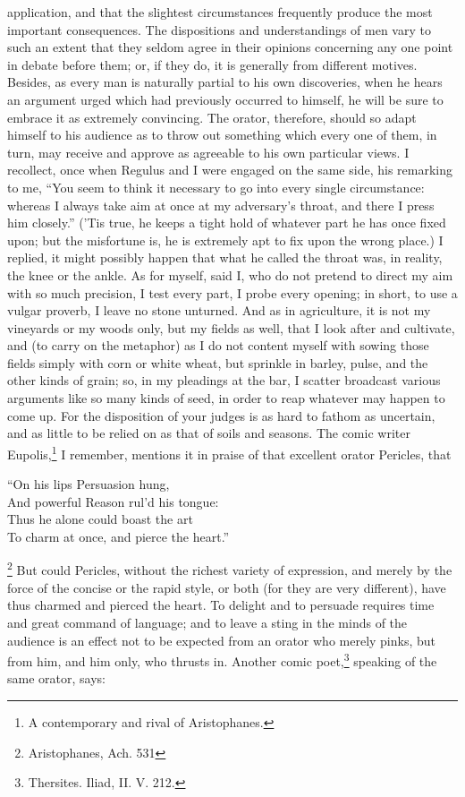 application, and that the slightest circumstances frequently produce the
most important consequences. The dispositions and understandings of men
vary to such an extent that they seldom agree in their opinions concerning
any one point in debate before them; or, if they do, it is generally from
different motives. Besides, as every man is naturally partial to his own
discoveries, when he hears an argument urged which had previously occurred
to himself, he will be sure to embrace it as extremely convincing. The
orator, therefore, should so adapt himself to his audience as to throw out
something which every one of them, in turn, may receive and approve as
agreeable to his own particular views. I recollect, once when Regulus and
I were engaged on the same side, his remarking to me, ``You seem to think
it necessary to go into every single circumstance: whereas I always take
aim at once at my adversary's throat, and there I press him closely.''
('Tis true, he keeps a tight hold of whatever part he has once fixed upon;
but the misfortune is, he is extremely apt to fix upon the wrong place.) I
replied, it might possibly happen that what he called the throat was, in
reality, the knee or the ankle. As for myself, said I, who do not pretend
to direct my aim with so much precision, I test every part, I probe every
opening; in short, to use a vulgar proverb, I leave no stone unturned. And
as in agriculture, it is not my vineyards or my woods only, but my fields
as well, that I look after and cultivate, and (to carry on the metaphor)
as I do not content myself with sowing those fields simply with corn or
white wheat, but sprinkle in barley, pulse, and the other kinds of grain;
so, in my pleadings at the bar, I scatter broadcast various arguments like
so many kinds of seed, in order to reap whatever may happen to come up.
For the disposition of your judges is as hard to fathom as uncertain, and
as little to be relied on as that of soils and seasons. The comic writer
Eupolis,\footnote{A contemporary and rival
of Aristophanes.}
I remember, mentions it in praise of that excellent orator Pericles, that

``On his lips Persuasion hung,\\
And powerful Reason rul'd his tongue:\\
Thus he alone could boast the art\\
To charm at once, and pierce the heart.''

\footnote{Aristophanes, Ach. 531}
But could Pericles, without the richest variety of expression, and merely
by the force of the concise or the rapid style, or both (for they are very
different), have thus charmed and pierced the heart. To delight and to
persuade requires time and great command of language; and to leave a sting
in the minds of the audience is an effect not to be expected from an
orator who merely pinks, but from him, and him only, who thrusts in.
Another comic poet,\footnote{Thersites. Iliad, II. V.
212.} speaking of the same orator, says:

